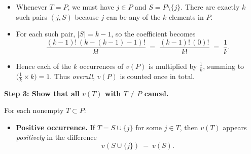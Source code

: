 {\begin{enumerate}
\begin{proofsketch}
\begin{itemize}
    \item Whenever $T = P$, we must have $j \in P$ and $S = P \setminus \{j\}$. There are exactly $k$ such pairs \((j,S)\) because $j$ can be any of the $k$ elements in $P$.
    \item For each such pair, $\lvert S\rvert = k-1$, so the coefficient becomes
    \[
       \frac{(k-1)!\,(k - (k-1) - 1)!}{k!}
       \;=\;
       \frac{(k-1)!\,(0)!}{k!}
       \;=\;
       \frac{1}{k}.
    \]
    \item Hence each of the $k$ occurrences of $v(P)$ is multiplied by $\tfrac{1}{k}$, summing to $\bigl(\frac{1}{k}\times k\bigr)=1$. Thus \emph{overall}, $v(P)$ is counted once in total. 
\end{itemize}

\medskip
\noindent
\textbf{Step 3: Show that all $v(T)$ with $T \neq P$ cancel.}

For each nonempty $T \subset P$:

\begin{itemize}
    \item \textbf{Positive occurrence.} 
    If $T = S \cup \{j\}$ for some $j \in T$, then $v(T)$ appears \emph{positively} in the difference 
    \[
      v(S \cup \{j\}) \;-\; v(S).
    \]


\end{itemize}
\end{proofsketch}
\end{enumerate}}
